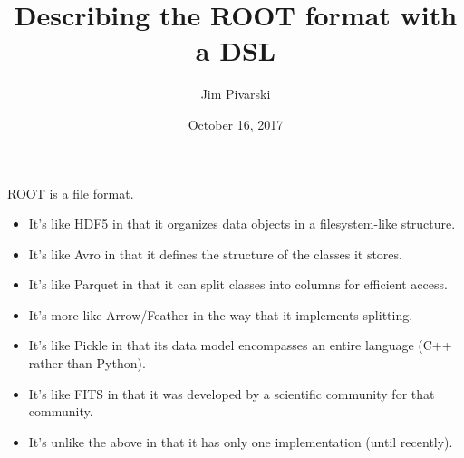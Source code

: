\documentclass[aspectratio=169]{beamer}
\title[2017-10-16-diana-rootspec]{Describing the ROOT format with a DSL}
\author{Jim Pivarski}
\institute{Princeton University -- DIANA}
\date{October 16, 2017}
\begin{document}

\begin{frame}
  \titlepage
\end{frame}




\begin{frame}{}
\vspace{0.5 cm}
\begin{center}
\large ROOT is a file format.
\end{center}

\begin{itemize}
\item It's like HDF5 in that it organizes data objects in a filesystem-like structure.
\item It's like Avro in that it defines the structure of the classes it stores.
\item It's like Parquet in that it can split classes into columns for efficient access.
\item It's more like Arrow/Feather in the way that it implements splitting.
\item It's like Pickle in that its data model encompasses an entire language (C++ rather than Python).
\item It's like FITS in that it was developed by a scientific community for that community.
\item It's unlike the above in that it has only one implementation (until recently).
\end{itemize}
\end{frame}
\end{document}
